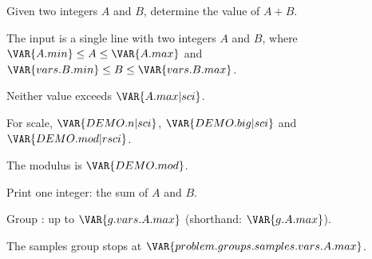 
Given two integers $A$ and $B$, determine the value of $A + B$.

The input is a single line with two integers $A$ and $B$, where
$\VAR{A.min} \le A \le \VAR{A.max}$ and
$\VAR{vars.B.min} \le B \le \VAR{vars.B.max}$.

Neither value exceeds $\VAR{A.max | sci}$.

For scale, $\VAR{DEMO.n | sci}$, $\VAR{DEMO.big | sci}$ and
$\VAR{DEMO.mod | rsci}$.

The modulus is $\VAR{DEMO.mod}$.

Print one integer: the sum of $A$ and $B$.

Group : up to $\VAR{g.vars.A.max}$ (shorthand: $\VAR{g.A.max}$).

The samples group stops at $\VAR{problem.groups.samples.vars.A.max}$.


